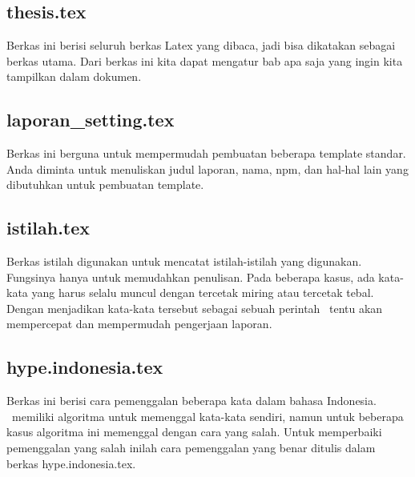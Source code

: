 \chapter{\babEmpat}
\thispagestyle{fancy}

\section{thesis.tex}
Berkas ini berisi seluruh berkas Latex yang dibaca, jadi bisa dikatakan sebagai 
berkas utama. Dari berkas ini kita dapat mengatur bab apa saja yang ingin 
kita tampilkan dalam dokumen.


\section{laporan\_setting.tex}
Berkas ini berguna untuk mempermudah pembuatan beberapa template standar. 
Anda diminta untuk menuliskan judul laporan, nama, npm, dan hal-hal lain yang 
dibutuhkan untuk pembuatan template. 


\section{istilah.tex}
Berkas istilah digunakan untuk mencatat istilah-istilah yang digunakan. 
Fungsinya hanya untuk memudahkan penulisan.
Pada beberapa kasus, ada kata-kata yang harus selalu muncul dengan tercetak 
miring atau tercetak tebal. 
Dengan menjadikan kata-kata tersebut sebagai sebuah perintah \latex~tentu akan 
mempercepat dan mempermudah pengerjaan laporan. 


\section{hype.indonesia.tex}
Berkas ini berisi cara pemenggalan beberapa kata dalam bahasa Indonesia. 
\latex~memiliki algoritma untuk memenggal kata-kata sendiri, namun untuk 
beberapa kasus algoritma ini memenggal dengan cara yang salah. 
Untuk memperbaiki pemenggalan yang salah inilah cara pemenggalan yang benar 
ditulis dalam berkas hype.indonesia.tex.


